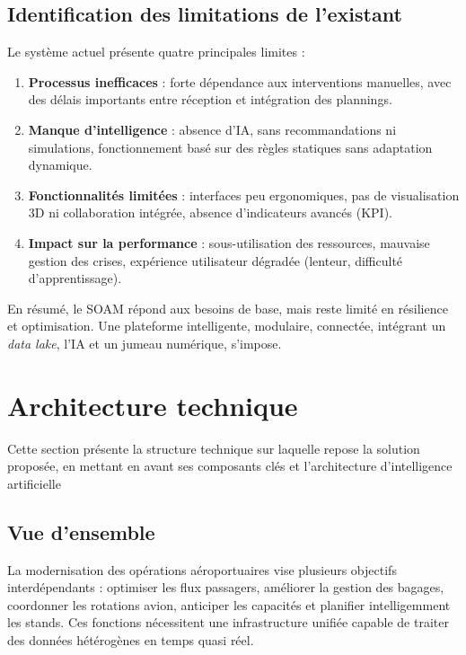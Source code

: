 \subsection{Identification des limitations de l'existant }

Le système actuel présente quatre principales limites :  

\begin{enumerate}
	\item \textbf{Processus inefficaces} : forte dépendance aux interventions manuelles, avec des délais importants entre réception et intégration des plannings.  
	\item \textbf{Manque d’intelligence} : absence d’IA, sans recommandations ni simulations, fonctionnement basé sur des règles statiques sans adaptation dynamique.  
	\item \textbf{Fonctionnalités limitées} : interfaces peu ergonomiques, pas de visualisation 3D ni collaboration intégrée, absence d’indicateurs avancés (KPI).  
	\item \textbf{Impact sur la performance} : sous-utilisation des ressources, mauvaise gestion des crises, expérience utilisateur dégradée (lenteur, difficulté d’apprentissage).
\end{enumerate}

En résumé, le \ac{SOAM} répond aux besoins de base, mais reste limité en résilience et optimisation. Une plateforme intelligente, modulaire, connectée, intégrant un \textit{data lake}, l’IA et un jumeau numérique, s’impose.


\vspace{-1.2em}




\section{Architecture technique}

Cette section présente la structure technique sur laquelle repose la solution proposée, en mettant en avant ses composants clés et l'architecture d'intelligence artificielle

\subsection{Vue d'ensemble}

La modernisation des opérations aéroportuaires vise plusieurs objectifs interdépendants : optimiser les flux passagers, améliorer la gestion des bagages, coordonner les rotations avion, anticiper les capacités et planifier intelligemment les stands. Ces fonctions nécessitent une infrastructure unifiée capable de traiter des données hétérogènes en temps quasi réel.

